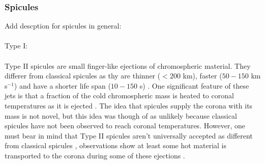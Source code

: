 \documentclass[12pt,a4paper,twoside]{article}
\begin{document}
\subsubsection{Spicules}
Add descption for spicules in general: \\ \\
Type I: \\ \\
Type II spicules are small finger-like ejections of chromospheric material. They differer from classical spicules as thy are thinner ($<200$ km), faster ($50-150$ km s$^{-1}$) and have a shorter life span ($10-150$ s) \citep{De_Pontieu2007}. One significant feature of these jets is that a fraction of the cold chromospheric mass is heated to coronal temperatures as it is ejected \citep{De_Pontieu2007}. The idea that spicules supply the corona with its mass is not novel\citep{Athay1982}, but this idea was though of as unlikely because classical spicules have not been observed to reach coronal temperatures. However, one must bear in mind that Type II spicules aren't universally accepted as different from classical spicules \citep{Zhang2012}, observations show at least some hot material is transported to the corona during some of these ejections \citep{Klimchuk2012}.        
\end{document}
